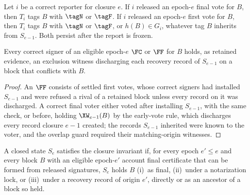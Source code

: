 \begin{lemma}
\label{lem:exposure}
Let $i$ be a correct reporter for closure $e$. If $i$ released an epoch-$e$ final vote for $B$, then $T_i$ tags $B$ with $\tagN$ or $\tagF$. If $i$ released an epoch-$e$ first vote for $B$, then $T_i$ tags $B$ with $\tagN$ or $\tagF$, or $h(B)\in G_i$, whatever tag $B$ inherits from $S_{e-1}$. Both persist after the report is frozen.
\end{lemma}
\begin{lemma}
\label{lem:holds}
Every correct signer of an eligible epoch-$e$ $\FC$ or $\FF$ for $B$ holds, as retained evidence, an exclusion witness discharging each recovery record of $S_{e-1}$ on a block that conflicts with $B$.
\end{lemma}
\begin{proof}
An $\FF$ consists of settled first votes, whose correct signers had installed $S_{e-1}$ and were refused a rival of a retained block unless every record on it was discharged. A correct final voter either voted after installing $S_{e-1}$, with the same check, or before, holding $\XW_{e-1}(B)$ by the early-vote rule, which discharges every record closure $e-1$ created; the records $S_{e-1}$ inherited were known to the voter, and the overlap guard required their matching-origin witnesses.
\end{proof}

\begin{definition}
\label{def:invariant}
A closed state $S_e$ satisfies the closure invariant if, for every epoch $e'\le e$ and every block $B$ with an eligible epoch-$e'$ account final certificate that can be formed from released signatures, $S_e$ holds $B$ (i)~as final, (ii)~under a notarization lock, or (iii)~under a recovery record of origin $e'$, directly or as an ancestor of a block so held.
\end{definition}

